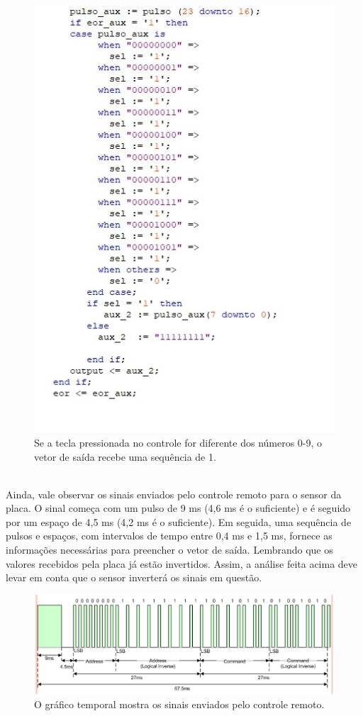 \documentclass[14pt, oneside]{book}
\newcommand\tab[1][1cm]{\hspace*{#1}}
\theoremstyle{definition}
\begin{document}
                \begin{figure}[H]
                    \centering
                    \includegraphics[scale=0.8]{case.png}
                    \caption{Se a tecla pressionada no controle for diferente dos números 0-9, o vetor de saída recebe uma sequência de 1.}
                    \label{figura}
                \end{figure} \\
                \tab Ainda, vale observar os sinais enviados pelo controle remoto para o sensor da placa. O sinal começa com um pulso de 9 ms (4,6 ms é o suficiente) e é seguido por um espaço de 4,5 ms (4,2 ms é o suficiente). Em seguida, uma sequência de pulsos e espaços, com intervalos de tempo entre 0,4 ms e 1,5 ms, fornece as informações necessárias para preencher o vetor de saída. Lembrando que os valores recebidos pela placa já estão invertidos. Assim, a análise feita acima deve levar em conta que o sensor inverterá os sinais em questão.\\
                \begin{figure}[H]
                    \centering
                    \includegraphics[scale=0.6]{grafico.png}
                    \caption{O gráfico temporal mostra os sinais enviados pelo controle remoto.}
                    \label{figura}
                \end{figure}
\end{document}
